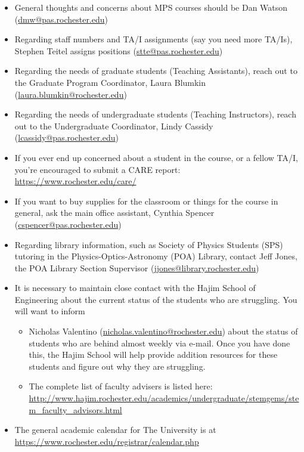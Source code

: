 \documentclass[12pt]{article}
\begin{document}
\begin{itemize}
	\item General thoughts and concerns about MPS courses should be Dan Watson (\url{dmw@pas.rochester.edu})
	\item Regarding staff numbers and TA/I assignments (say you need more TA/Is), Stephen Teitel assigns positions (\url{stte@pas.rochester.edu})
	\item Regarding the needs of graduate students (Teaching Assistants), reach out to the Graduate Program Coordinator, Laura Blumkin (\url{laura.blumkin@rochester.edu})
	\item Regarding the needs of undergraduate students (Teaching Instructors), reach out to the Undergraduate Coordinator, Lindy Cassidy (\url{lcassidy@pas.rochester.edu})
	\item If you ever end up concerned about a student in the course, or a fellow TA/I, you're encouraged to submit a CARE report: \url{https://www.rochester.edu/care/}
	\item If you want to buy supplies for the classroom or things for the course in general, ask the main office assistant, Cynthia Spencer (\url{cspencer@pas.rochester.edu})
	\item Regarding library information, such as Society of Physics Students (SPS) tutoring in the Physics-Optics-Astronomy (POA) Library, contact Jeff Jones, the POA Library Section Supervisor (\url{jjones@library.rochester.edu})
	\item It is necessary to maintain close contact with the Hajim School of Engineering about the current status of the students who are struggling. You will want to inform
		\begin{itemize}
			\item Nicholas Valentino (\url{nicholas.valentino@rochester.edu}) about the status of students who are behind almost weekly via e-mail. Once you have done this, the Hajim School will help provide addition resources for these students and figure out why they are struggling.
			\item The complete list of faculty advisers is listed here: \url{http://www.hajim.rochester.edu/academics/undergraduate/stemgems/stem\_faculty_advisors.html}
		\end{itemize}
	\item The general academic calendar for The University is at \url{https://www.rochester.edu/registrar/calendar.php}
\end{itemize}
\end{document}
